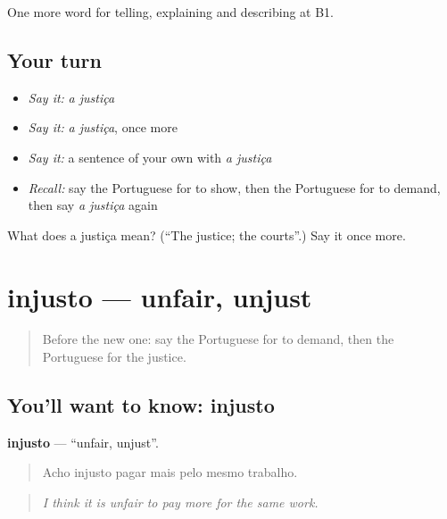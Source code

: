 \begin{grammarlens}[title={What you've built}]
One more word for telling, explaining and describing at B1.
\end{grammarlens}

\subsection*{Your turn}
\begin{itemize}
\raggedright
  \item \emph{Say it:} \emph{a justiça}
  \item \emph{Say it:} \emph{a justiça}, once more
  \item \emph{Say it:} a sentence of your own with \emph{a justiça}
  \item \emph{Recall:} say the Portuguese for to show, then the Portuguese for to demand, then say \emph{a justiça} again
\end{itemize}

\begin{tcolorbox}[breakable,colback=teal!4,colframe=teal!35!black,title={Before you move on}]
What does a justiça mean? (\textquotedblleft{}The justice; the courts\textquotedblright{}.) Say it once more.
\end{tcolorbox}
\section[injusto]{injusto — unfair, unjust}

\label{lesson:PT-C365-injusto}



\begin{quote}
Before the new one: say the Portuguese for to demand, then the Portuguese for the justice.
\end{quote}

\subsection*{You'll want to know: injusto}
\textbf{injusto} — \textquotedblleft{}unfair, unjust\textquotedblright{}.

\begin{quote}
Acho injusto pagar mais pelo mesmo trabalho.
\end{quote}

\begin{quote}
\emph{I think it is unfair to pay more for the same work.}
\end{quote}

